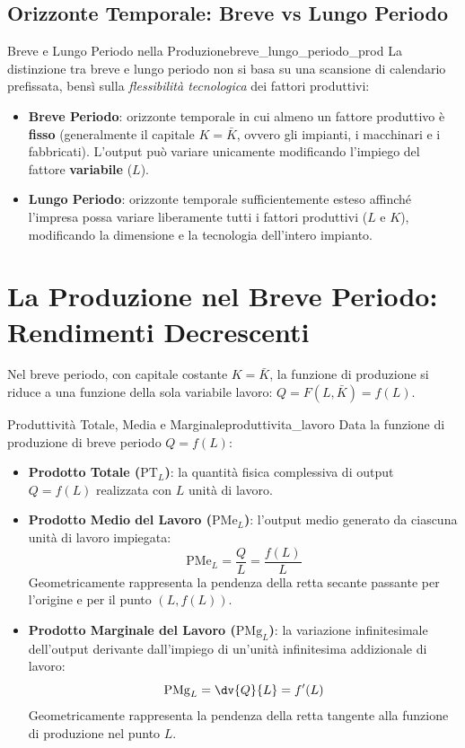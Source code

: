 \subsection{Orizzonte Temporale: Breve vs Lungo Periodo}
\begin{definizione}{Breve e Lungo Periodo nella Produzione}{breve_lungo_periodo_prod}
La distinzione tra breve e lungo periodo non si basa su una scansione di calendario prefissata, bensì sulla \textit{flessibilità tecnologica} dei fattori produttivi:
\begin{itemize}
    \item \textbf{Breve Periodo}: orizzonte temporale in cui almeno un fattore produttivo è \textbf{fisso} (generalmente il capitale $K = \bar{K}$, ovvero gli impianti, i macchinari e i fabbricati). L'output può variare unicamente modificando l'impiego del fattore \textbf{variabile} ($L$).
    \item \textbf{Lungo Periodo}: orizzonte temporale sufficientemente esteso affinché l'impresa possa variare liberamente tutti i fattori produttivi ($L$ e $K$), modificando la dimensione e la tecnologia dell'intero impianto.
\end{itemize}
\end{definizione}

\section{La Produzione nel Breve Periodo: Rendimenti Decrescenti}

Nel breve periodo, con capitale costante $K = \bar{K}$, la funzione di produzione si riduce a una funzione della sola variabile lavoro: $Q = F(L, \bar{K}) = f(L)$.

\begin{definizione}{Produttività Totale, Media e Marginale}{produttivita_lavoro}
Data la funzione di produzione di breve periodo $Q = f(L)$:
\begin{itemize}
    \item \textbf{Prodotto Totale ($\mathrm{PT}_L$)}: la quantità fisica complessiva di output $Q = f(L)$ realizzata con $L$ unità di lavoro.
    \item \textbf{Prodotto Medio del Lavoro ($\mathrm{PMe}_L$)}: l'output medio generato da ciascuna unità di lavoro impiegata:
    \begin{equation}
        \mathrm{PMe}_L = \frac{Q}{L} = \frac{f(L)}{L}
    \end{equation}
    Geometricamente rappresenta la pendenza della retta secante passante per l'origine e per il punto $(L, f(L))$.
    \item \textbf{Prodotto Marginale del Lavoro ($\mathrm{PMg}_L$)}: la variazione infinitesimale dell'output derivante dall'impiego di un'unità infinitesima addizionale di lavoro:
    \begin{equation}
        \mathrm{PMg}_L = \dv{Q}{L} = f'(L)
    \end{equation}
    Geometricamente rappresenta la pendenza della retta tangente alla funzione di produzione nel punto $L$.
\end{itemize}
\end{definizione}

